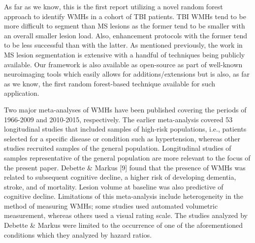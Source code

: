 \documentclass[11pt,]{article}
\begin{document}
As far as we know, this is the first report utilizing a novel random
forest approach to identify WMHs in a cohort of TBI patients. TBI WMHs
tend to be more difficult to segment than MS lesions as the former tend
to be smaller with an overall smaller lesion load. Also, enhancement
protocols with the former tend to be less successful than with the
latter. As mentioned previously, the work in MS lesion segmentation is
extensive with a handful of techniques being publicly available. Our
framework is also available as open-source as part of well-known
neuroimaging tools which easily allows for additions/extensions but is
also, as far as we know, the first random forest-based technique
available for such application.

Two major meta-analyses of WMHs have been published covering the periods
of 1966-2009 and 2010-2015, respectively. The earlier meta-analysis
covered 53 longitudinal studies that included samples of high-risk
populations, i.e., patients selected for a specific disease or condition
such as hypertension, whereas other studies recruited samples of the
general population. Longitudinal studies of samples representative of
the general population are more relevant to the focus of the present
paper. Debette \& Markus {[}9{]} found that the presence of WMHs was
related to subsequent cognitive decline, a higher risk of developing
dementia, stroke, and of mortality. Lesion volume at baseline was also
predictive of cognitive decline. Limitations of this meta-analysis
include heterogeneity in the method of measuring WMHs; some studies used
automated volumetric measurement, whereas others used a visual rating
scale. The studies analyzed by Debette \& Markus were limited to the
occurrence of one of the aforementioned conditions which they analyzed
by hazard ratios.
\end{document}

